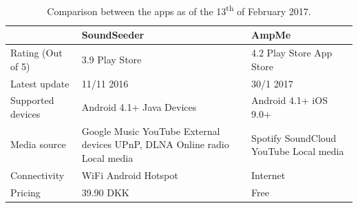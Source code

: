 \begin{table}
\renewcommand\tabularxcolumn[1]{m{#1}}
\renewcommand{\arraystretch}{1.8}
    \small
    \begin{tabularx}{\textwidth}{XXX}\toprule
                                    & SoundSeeder                   & AmpMe                                                                     \\\midrule
        Rating (Out of 5)           & 3.9 Play Store                & 4.2 Play Store \newline 4.0 App Store                                     \\
        Latest update               & 11/11 2016                    & 30/1 2017                                                                 \\
        Supported \newline devices  & Android 4.1+ \newline Java Devices & Android 4.1+ \newline iOS 9.0+                                       \\
        Media source                & Google Music \newline YouTube \newline External devices \newline UPnP, DLNA \newline Online radio \newline Local media & Spotify \newline SoundCloud \newline YouTube \newline Local media  \\
        Connectivity                & WiFi \newline Android Hotspot & Internet                                                                  \\
        Pricing                     & 39.90 DKK                     & Free                                                                      \\\bottomrule
    \end{tabularx}
    \caption{Comparison between the apps as of the 13\textsuperscript{th} of February 2017.}\label{tab:sota_comp}
\end{table}
